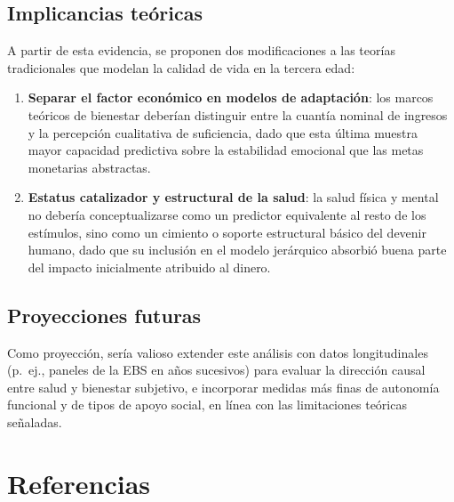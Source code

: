\documentclass[
  spanish,
  a4paper,
  oneside]{scrbook}
\providecommand{\tightlist}{%
  \setlength{\itemsep}{0pt}\setlength{\parskip}{0pt}}
\begin{document}
\section{Implicancias teóricas}\label{implicancias-teuxf3ricas}

A partir de esta evidencia, se proponen dos modificaciones a las teorías
tradicionales que modelan la calidad de vida en la tercera edad:

\begin{enumerate}
\def\labelenumi{\arabic{enumi}.}
\tightlist
\item
  \textbf{Separar el factor económico en modelos de adaptación}: los
  marcos teóricos de bienestar deberían distinguir entre la cuantía
  nominal de ingresos y la percepción cualitativa de suficiencia, dado
  que esta última muestra mayor capacidad predictiva sobre la
  estabilidad emocional que las metas monetarias abstractas.
\item
  \textbf{Estatus catalizador y estructural de la salud}: la salud
  física y mental no debería conceptualizarse como un predictor
  equivalente al resto de los estímulos, sino como un cimiento o soporte
  estructural básico del devenir humano, dado que su inclusión en el
  modelo jerárquico absorbió buena parte del impacto inicialmente
  atribuido al dinero.
\end{enumerate}

\section{Proyecciones futuras}\label{proyecciones-futuras}

Como proyección, sería valioso extender este análisis con datos
longitudinales (p.~ej., paneles de la EBS en años sucesivos) para
evaluar la dirección causal entre salud y bienestar subjetivo, e
incorporar medidas más finas de autonomía funcional y de tipos de apoyo
social, en línea con las limitaciones teóricas señaladas.


\chapter{Referencias}\label{referencias}
\end{document}
